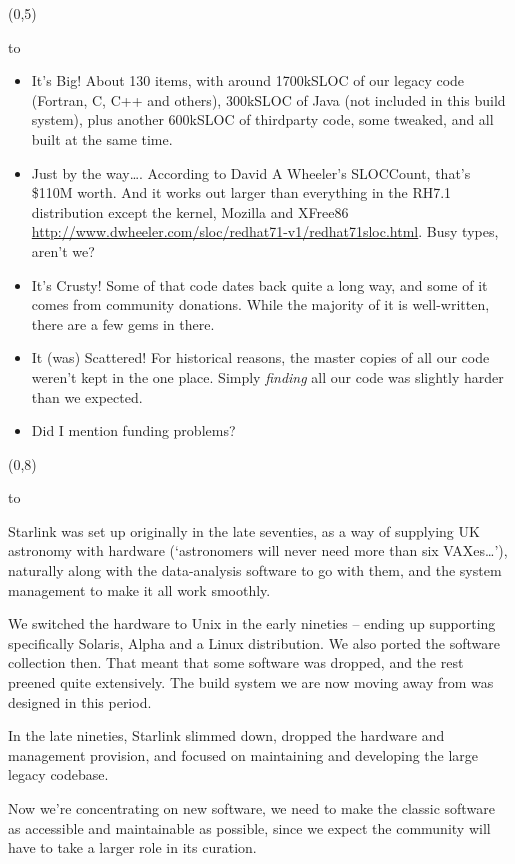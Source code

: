 \documentclass[a0]{a0poster}
\def\Head#1{\noindent\hbox to \hsize{\hfil{\LARGE\color{DarkBlue} #1}}\bigskip}
\begin{document}
\begin{textblock}{7}(0,5)

\Head{The problems}

\begin{itemize}
\item It's Big!  About 130 items, with around 1700kSLOC of our
  legacy code (Fortran, C, C++ and others), 300kSLOC of Java (not included in
  this build system), plus another 600kSLOC of thirdparty code, some
  tweaked, and all built at the same time.

\item Just by the way\dots.  According to David A Wheeler's SLOCCount,
  that's \$110M worth.  And it works out larger than everything in the
  RH7.1 distribution except the kernel, Mozilla and XFree86
  \url{http://www.dwheeler.com/sloc/redhat71-v1/redhat71sloc.html}.
  Busy types, aren't we?

\item It's Crusty!  Some of that code dates back quite a long way, and
  some of it comes from community donations.  While the majority of it
  is well-written, there are a few gems in there.

\item It (was) Scattered!  For historical reasons, the master copies
  of all our code weren't kept in the one place.  Simply
  \emph{finding} all our code was slightly harder than we expected.

\item Did I mention funding problems?

\end{itemize}
\end{textblock}


\begin{textblock}{7}(0,8)

\Head{History}

Starlink was set up originally in the late seventies, as a way of
supplying UK astronomy with hardware (`astronomers will never need
more than six VAXes\dots'), naturally along with the data-analysis
software to go with them, and the system management to make it all
work smoothly.

We switched the hardware to Unix in the early nineties -- ending up
supporting specifically Solaris, Alpha and a Linux distribution.  We
also ported the software collection then.  That meant that some
software was dropped, and the rest preened quite extensively.
The build system we are now moving away from was designed in this
period.

In the late nineties, Starlink slimmed down, dropped the hardware and
management provision, and focused on maintaining and developing the
large legacy codebase.

Now we're concentrating on new software, we need to make the classic
software as accessible and maintainable as possible, since we expect
the community will have to take a larger role in its curation.

\end{textblock}
\end{document}
